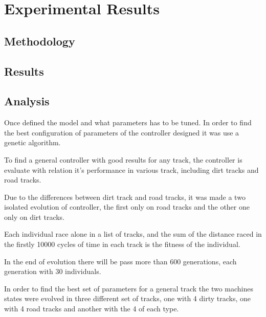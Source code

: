 \section{Experimental Results} \label{sec:Experiments}



\subsection{Methodology} \label{subsec:Methodology}

	
\subsection{Results} \label{subsec:Results}

	
\subsection{Analysis} \label{subsec:Analysis}

	

	Once defined the model and what parameters has to be tuned. In order to find the best configuration of parameters of the controller designed it was use a genetic algorithm.
	
	To find a general controller with good results for any track, the controller is evaluate with relation it's performance in various track, including dirt tracks and road tracks. 
	
	Due to the differences between dirt track and road tracks, it was made a two isolated evolution of controller, the first only on road tracks and the other one only on dirt tracks.
	
	Each individual race alone in a list of tracks, and the sum of the distance raced in the firstly 10000 cycles of time in each track is the fitness of the individual.
	
	In the end of evolution there will be pass more than 600 generations, each generation with 30 individuals.
	
	In order to find the best set of parameters for a general track the two machines states were evolved in three different set of tracks, one with 4 dirty tracks, one with 4 road tracks and another with the 4 of each type. 
	
